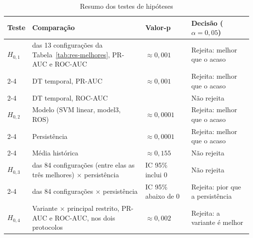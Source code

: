 \begin{table}[htbp]
    \centering
    \footnotesize
    \caption{Resumo dos testes de hipóteses}
    \label{tab:res-hipoteses-resumo}
    \begin{tabular}{p{1.0cm}>{\raggedright\arraybackslash}p{5.2cm}>{\raggedright\arraybackslash}p{2.3cm}%
                    >{\raggedright\arraybackslash}p{4.2cm}}
        \toprule
        Teste & Comparação & Valor-p & Decisão ($\alpha = 0{,}05$) \\
        \midrule
        $H_{0,1}$ & 12 das 13 configurações da Tabela~\ref{tab:res-melhores}, PR-AUC e ROC-AUC
            & $\approx 0{,}001$ & Rejeita: melhor que o acaso \\
        \cmidrule(l){2-4}
            & DT temporal, PR-AUC & $\approx 0{,}001$ & Rejeita: melhor que o acaso \\
        \cmidrule(l){2-4}
            & DT temporal, ROC-AUC & 1 & Não rejeita \\
        \midrule
        $H_{0,2}$ & Modelo (SVM linear, model3, ROS) & $\approx 0{,}0001$ & Rejeita: melhor que o acaso \\
        \cmidrule(l){2-4}
            & Persistência & $\approx 0{,}0001$ & Rejeita: melhor que o acaso \\
        \cmidrule(l){2-4}
            & Média histórica & $\approx 0{,}155$ & Não rejeita \\
        \midrule
        $H_{0,3}$ & 10 das 84 configurações (entre elas as três melhores) $\times$ persistência & IC 95\% inclui 0 & Não rejeita \\
        \cmidrule(l){2-4}
            & 74 das 84 configurações $\times$ persistência & IC 95\% abaixo de 0 & Rejeita: pior que a persistência \\
        \midrule
        $H_{0,4}$ & Variante $\times$ principal restrito, PR-AUC e ROC-AUC, nos dois protocolos
            & $\approx 0{,}002$ & Rejeita: a variante é melhor \\
        \bottomrule
    \end{tabular}
\end{table}%
